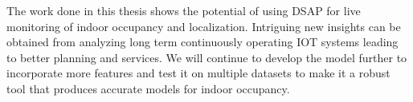 The work done in this thesis shows the potential of using DSAP for live monitoring of indoor occupancy and localization. Intriguing new insights can be obtained from analyzing long term continuously operating IOT systems leading to better planning and services. We will continue to develop the model further to incorporate more features and test it on multiple datasets to make it a robust tool that produces accurate models for indoor occupancy.  










